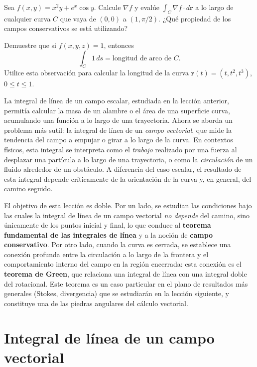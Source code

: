 \begin{prob}
Sea \(f(x,y) = x^2 y + e^x \cos y\). Calcule \(\nabla f\) y evalúe
\(\displaystyle \int_C \nabla f \cdot d\mathbf{r}\) a lo largo de
cualquier curva \(C\) que vaya de \((0,0)\) a \((1,\pi/2)\).
¿Qué propiedad de los campos conservativos se está utilizando?
\end{prob}

\begin{prob}
Demuestre que si \(f(x,y,z) = 1\), entonces
\[
\int_C 1\,ds = \text{longitud de arco de } C.
\]
Utilice esta observación para calcular la longitud de la curva
\(\mathbf{r}(t) = (t, t^2, t^3)\), \(0\le t\le 1\).
\end{prob}

La integral de línea de un campo escalar, estudiada en la lección anterior,
permitía calcular la masa de un alambre o el área de una superficie curva,
acumulando una función a lo largo de una trayectoria. Ahora se aborda un
problema más sutil: la integral de línea de un \emph{campo vectorial}, que
mide la tendencia del campo a empujar o girar a lo largo de la curva. En
contextos físicos, esta integral se interpreta como el \emph{trabajo}
realizado por una fuerza al desplazar una partícula a lo largo de una
trayectoria, o como la \emph{circulación} de un fluido alrededor de un
obstáculo. A diferencia del caso escalar, el resultado de esta integral
depende críticamente de la orientación de la curva y, en general, del
camino seguido.

El objetivo de esta lección es doble. Por un lado, se estudian las
condiciones bajo las cuales la integral de línea de un campo vectorial
\emph{no depende} del camino, sino únicamente de los puntos inicial y
final, lo que conduce al \textbf{teorema fundamental de las integrales
de línea} y a la noción de \textbf{campo conservativo}. Por otro lado,
cuando la curva es cerrada, se establece una conexión profunda entre la
circulación a lo largo de la frontera y el comportamiento interno del
campo en la región encerrada: esta conexión es el \textbf{teorema de
Green}, que relaciona una integral de línea con una integral doble del
rotacional. Este teorema es un caso particular en el plano de resultados
más generales (Stokes, divergencia) que se estudiarán en la lección
siguiente, y constituye una de las piedras angulares del cálculo
vectorial.

\section{Integral de línea de un campo vectorial}

